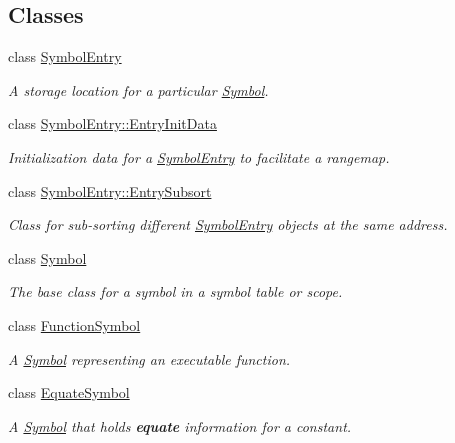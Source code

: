 \subsection*{Classes}
\begin{DoxyCompactItemize}
\item 
class \mbox{\hyperlink{class_symbol_entry}{Symbol\+Entry}}
\begin{DoxyCompactList}\small\item\em A storage location for a particular \mbox{\hyperlink{class_symbol}{Symbol}}. \end{DoxyCompactList}\item 
class \mbox{\hyperlink{class_symbol_entry_1_1_entry_init_data}{Symbol\+Entry\+::\+Entry\+Init\+Data}}
\begin{DoxyCompactList}\small\item\em Initialization data for a \mbox{\hyperlink{class_symbol_entry}{Symbol\+Entry}} to facilitate a rangemap. \end{DoxyCompactList}\item 
class \mbox{\hyperlink{class_symbol_entry_1_1_entry_subsort}{Symbol\+Entry\+::\+Entry\+Subsort}}
\begin{DoxyCompactList}\small\item\em Class for sub-\/sorting different \mbox{\hyperlink{class_symbol_entry}{Symbol\+Entry}} objects at the same address. \end{DoxyCompactList}\item 
class \mbox{\hyperlink{class_symbol}{Symbol}}
\begin{DoxyCompactList}\small\item\em The base class for a symbol in a symbol table or scope. \end{DoxyCompactList}\item 
class \mbox{\hyperlink{class_function_symbol}{Function\+Symbol}}
\begin{DoxyCompactList}\small\item\em A \mbox{\hyperlink{class_symbol}{Symbol}} representing an executable function. \end{DoxyCompactList}\item 
class \mbox{\hyperlink{class_equate_symbol}{Equate\+Symbol}}
\begin{DoxyCompactList}\small\item\em A \mbox{\hyperlink{class_symbol}{Symbol}} that holds {\bfseries{equate}} information for a constant. \end{DoxyCompactList}\item 

\end{DoxyCompactItemize}
